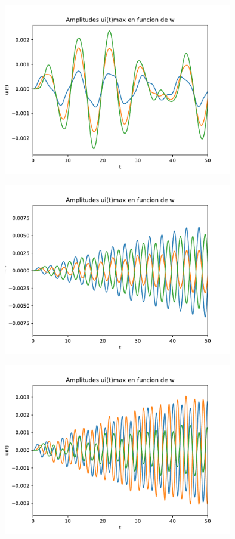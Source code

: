 \documentclass[11pt,letterpaper]{exam}
\begin{document}
\begin{center}
\includegraphics[width=10cm]{SegundaGraficaUi(t).pdf}
\end{center}

\begin{center}
\includegraphics[width=10cm]{TerceraGraficaUi(t).pdf}
\end{center}

\begin{center}
\includegraphics[width=10cm]{CuartaGraficaUi(t).pdf}
\end{center}
\end{document}
